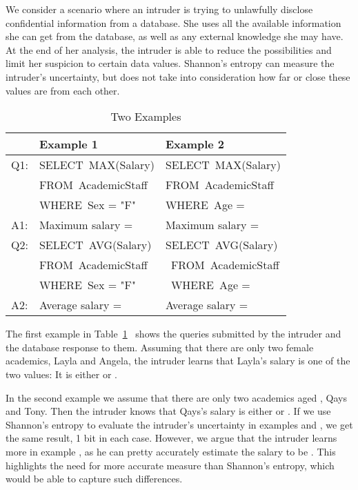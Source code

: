 \documentclass{llncs}
\begin{document}
We consider a scenario where an intruder is trying to unlawfully
disclose confidential information from a database. She uses
all the available information she can get from the database, as well as any external knowledge she may have. At the
end of her analysis, the intruder is able to reduce the possibilities
and limit her suspicion to certain data values. Shannon's entropy can measure the
intruder's uncertainty, but does not
take into consideration how far or close these values are from
each other.

\begin{table}[h]
\begin{center}
\footnotesize{
\caption{Two Examples} \label{table:QueryExample}
\begin{tabular}{| l | l |l|}
\hline & \textbf{Example 1} & \textbf{Example 2}\\
\hline Q1: & SELECT~MAX(Salary) & SELECT~MAX(Salary) \\
& FROM~AcademicStaff & FROM~AcademicStaff\\
& WHERE~Sex = "F" & WHERE~Age = \\
\hline A1: & Maximum salary =  & Maximum salary =  \\
\hline Q2: & SELECT~AVG(Salary) & SELECT~AVG(Salary) \\
& FROM~AcademicStaff & ~FROM~AcademicStaff\\
& WHERE~Sex = "F" & ~WHERE~Age = \\
\hline A2: & Average salary =  & Average salary = \\
\hline
\end{tabular}}
 \end{center}
\end{table}
The first example in Table~\ref{table:QueryExample}~ shows the
queries submitted by the intruder and the database response to
them. Assuming that there are only two female academics, Layla and
Angela, the intruder learns that Layla's salary is one of the two
values: It is either  or .

In the second example we assume that there are only two academics aged ,
Qays and Tony. Then the intruder knows that Qays's salary
is either  or . If we  use Shannon's entropy to evaluate the intruder's uncertainty  in examples  and , we get
 the same result, 1 bit in each case. However, we argue that the
intruder learns more in example , as he can pretty accurately
estimate the salary to be . This highlights the
need for more accurate measure than Shannon's entropy, which would
be able to capture such differences.
\end{document}
